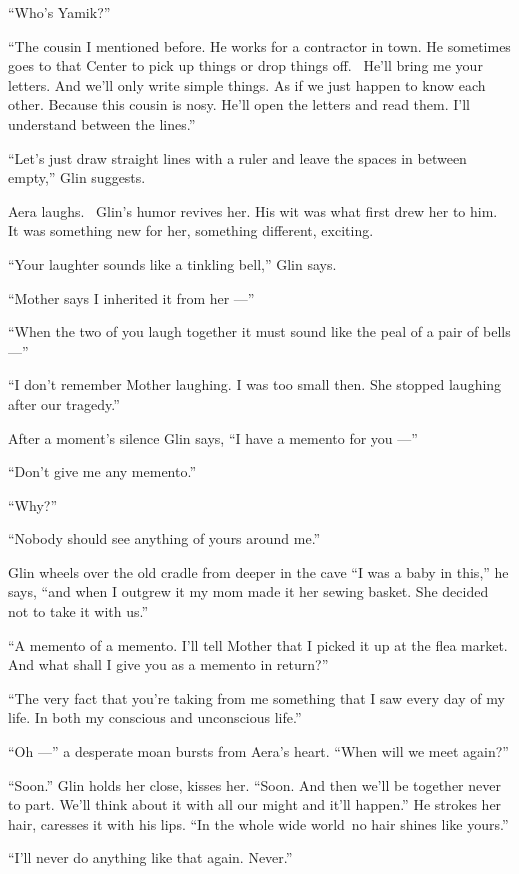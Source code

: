 \documentclass[twoside,11pt]{book}
\begin{document}
``Who's Yamik?''

``The cousin I mentioned before. He works for a contractor in town. He sometimes goes to that Center to
pick up things or drop things off.~ He'll bring me your letters. And we'll only write simple things. As if we just
happen to know each other. Because this cousin is nosy. He'll open the letters and read them. I'll understand between
the lines.''

``Let's just draw straight lines with a ruler and leave the spaces in between empty,'' Glin
suggests.

Aera laughs. ~Glin's humor revives her. His wit was what first drew her to him. It was something new for her, something
different, exciting.

``Your laughter sounds like a tinkling bell,'' Glin says.

``Mother says I inherited it from her ---''

``When the two of you laugh together it must sound like the peal of a pair of bells ---''

``I don't remember Mother laughing. I was too small then. She stopped laughing after our
tragedy.''

After a moment's silence Glin says, ``I have a memento for you ---''

``Don't give me any memento.''

``Why?''

``Nobody should see anything of yours around me.''

Glin wheels over the old cradle from deeper in the cave ``I was a baby in this,'' he says,
``and when I outgrew it my mom made it her sewing basket. She decided not to take it with
us.''

``A memento of a memento. I'll tell Mother that I picked it up at the flea market. And what shall I give
you as a memento in return?''

``The very fact that you're taking from me something that I saw every day of my life. In both my conscious
and unconscious life.''

``Oh ---'' a desperate moan bursts from Aera's heart. ``When will we meet
again?''

``Soon.'' Glin holds her close, kisses her. ``Soon. And then we'll be together
never to part. We'll think about it with all our might and it'll happen.'' He strokes her hair, caresses
it with his lips. ``In the whole wide world~no hair shines like yours.''

``I'll never do anything like that again. Never.''
\end{document}
